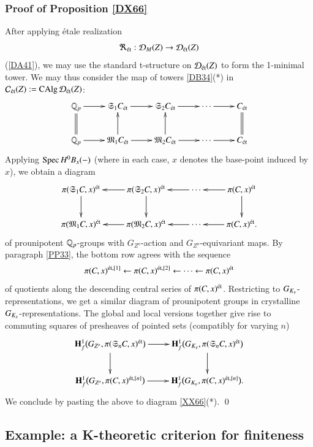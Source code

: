 \subsubsection{Proof of Proposition \ref{DX66}}
\label{DX66proof}
After applying \'etale realization 
\[
\Re_{\textrm {\'et}}: \mathcal{D}_M(Z) \to \mathcal{D}_{\textrm {\'et}}(Z)
\]
(\ref{DA41}), we may use the standard t-structure on $\mathcal{D}_{\textrm {\'et}}(Z)$ to form the 1-minimal tower. We may thus consider the map of towers \ref{DB34}(*) in $\mathcal{C}_{\textrm {\'et}}(Z) := \operatorname{CAlg} \mathcal{D}_{\textrm {\'et}}(Z)$: 
\[
\xymatrix{
\Qp  \ar[r] & \fkS_1 C_\et  \ar[r] & \fkS_2 C_\et  \ar[r] & \cdots  \ar[r] & C_\et 
\\
\Qp \ar@{=}[u] \ar[r] & 
\fkM_1 C_\et  \ar[r] \ar[u] & \fkM_2 C_\et  \ar[r] \ar[u] & \cdots  \ar[r] & C_\et \ar@{=}[u]
}
\]
Applying $\operatorname{Spec} H^0B_x(-)$ (where in each case, $x$ denotes the base-point induced by $x$), we obtain a diagram
\[
\xymatrix{
\pi(\fkS_1 C, x)^\et \ar[d] &
\pi(\fkS_2 C, x)^\et \ar[l] \ar[d] &
\cdots \ar[l] &
\pi(C, x)^\et \ar[l] \ar[d]
\\
\pi(\fkM_1 C, x)^\et &
\pi(\fkM_2 C, x)^\et \ar[l] &
\cdots \ar[l] &
\pi(C, x)^\et. \ar[l]
}
\]
of prounipotent ${\mathbb{Q}_p}$-groups with $G_{Z^o}$-action and $G_{Z^o}$-equivariant maps. By paragraph \ref{PP33}, the bottom row agrees with the sequence
\[
\pi(C,x)^{{\textrm {\'et}}, [1]} \leftarrow
\pi(C,x)^{{\textrm {\'et}}, [2]} \leftarrow
\cdots \leftarrow
\pi(C,x)^{\textrm {\'et}}
\]
of quotients along the descending central series of $\pi(C,x)^{\textrm {\'et}}$. Restricting to $G_{K_{\mathfrak{p}}}$-representations, we get a similar diagram of prounipotent groups in crystalline $G_{K_{\mathfrak{p}}}$-representations. The global and local versions together give rise to commuting squares of presheaves of pointed sets (compatibly for varying $n$) 
\[
\xymatrix{
\mathbf{H}^1_f \big( 
G_{Z^o}, \pi(\fkS_nC,x)^{\et}
\big)
\ar[r] \ar[d]
&
\mathbf{H}^1_f \big( 
G_{K_\pP}, \pi(\fkS_nC,x)^{\et}
\big)
\ar[d]
\\
\mathbf{H}^1_f \big( 
G_{Z^o}, \pi(C,x)^{\et, [n]}
\big)
\ar[r]
&
\mathbf{H}^1_f \big( 
G_{K_\pP}, \pi(C,x)^{\et, [n]}
\big).
}
\]
We conclude by pasting the above to diagram \ref{XX66}(*). \qed 

\subsection{Example: a K-theoretic criterion for finiteness}
\label{Sec:Sample}

